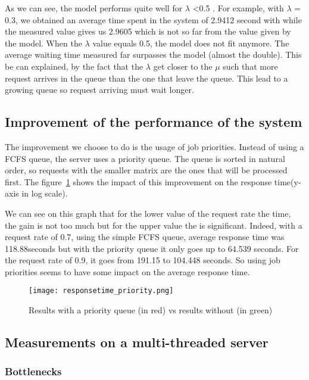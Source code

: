 As we can see, the model performs quite well for $\lambda$ <0.5 . For example, with $\lambda$ = 0.3,
we obtained an average time spent in the system of 2.9412 second with while the measured value gives us
2.9605 which is not so far from the value given by the model. When the $\lambda$ value equals 0.5, the
model does not fit anymore. The average waiting time measured far surpasses the model (almost the
double). This be can explained, by the fact that the $\lambda$ get closer to the $\mu$ such that more
request arrives in the queue than the one that leave the queue. This lead to a growing queue so request
arriving must wait longer.


\subsection{Improvement of the performance of the system}
\label{sub:Improvement of the performance of the system}
The improvement we choose to do is the usage of job priorities. Instead of using a FCFS queue,
the server uses a priority queue. The queue is sorted in natural order, so requests with the smaller matrix
are the ones that will be processed first. The figure~\ref{fig:priorityqueue} shows the impact of this
improvement on the response time(y-axis in log scale).

We can see on this graph that for the lower value of the request rate the time, the gain is not too much but
for the upper value the is significant. Indeed, with a request rate of 0.7, using the simple FCFS queue, average
response time was 118.88seconds but with the priority queue it only goes up to 64.539 seconds. For the
request rate of 0.9, it goes from 191.15 to 104.448 seconds. So using job priorities seems to have
some impact on the average response time.

\begin{figure}[!ht]
    \centering
    \texttt{[image: responsetime\_priority.png]}
    \caption{Results with a priority queue (in red) vs results without (in green)}
    \label{fig:priorityqueue}
\end{figure}

\subsection{Measurements on a multi-threaded server}
\label{sub:Measurements on a multi-threaded server}

\subsubsection{Bottlenecks}
\label{subs:Bottlenecks}


